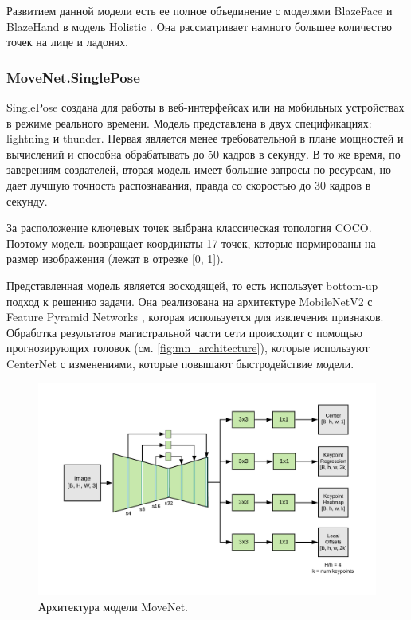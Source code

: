 Развитием данной модели есть ее полное объединение с моделями BlazeFace и BlazeHand в модель Holistic \cite{Holistic}. Она рассматривает намного большее количество точек на лице и ладонях.



\subsubsection{MoveNet.SinglePose}
\label{subsubsec:movenet_desc}

SinglePose создана для работы в веб-интерфейсах или на мобильных устройствах в режиме реального времени. \cite{MoveNet} Модель представлена в двух спецификациях: lightning и thunder. Первая является менее требовательной в плане мощностей и вычислений и способна обрабатывать до 50 кадров в секунду. В то же время, по заверениям создателей, вторая модель имеет большие запросы по ресурсам, но дает лучшую точность распознавания, правда со скоростью до 30 кадров в секунду. 

За расположение ключевых точек выбрана классическая топология COCO. Поэтому модель возвращает координаты 17 точек, которые нормированы на размер изображения (лежат в отрезке [0, 1]).

Представленная модель является восходящей, то есть использует bottom-up подход к решению задачи. Она реализована на архитектуре MobileNetV2 \cite{mobilenetv2} с Feature Pyramid Networks \cite{feature_piramid}, которая используется для извлечения признаков. Обработка результатов магистральной части сети происходит с помощью прогнозирующих головок (см. \autoref{fig:mn_architecture}), которые используют CenterNet \cite{CenterNet} с изменениями, которые повышают быстродействие модели.

\begin{figure}[t]
	\centering
	\includegraphics[width=\textwidth * 4 / 5]{./images/MoveNet/architecture}
	\caption{Архитектура модели MoveNet. \cite{MoveNet}}
	\label{fig:mn_architecture}
\end{figure}

